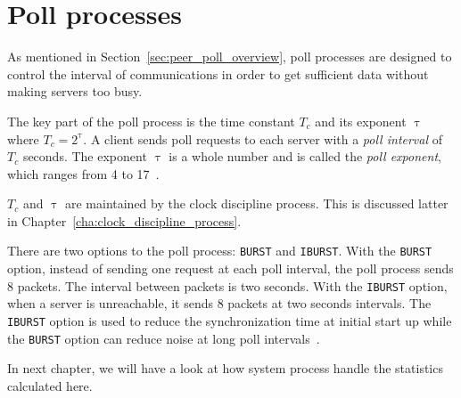 \section{Poll processes}%
\label{sec:poll_processes}
As mentioned in Section~\ref{sec:peer_poll_overview}, poll processes are
designed to control the interval of communications in order to get sufficient
data without making servers too busy. 

The key part of the poll process is the time constant $T_c$ and its
exponent $\uptau$ where $T_c = 2 ^ {\uptau}$. A client sends poll requests to
each server with a \emph{poll interval} of $T_c$ seconds. The exponent $\uptau$
is a whole number and is called the \emph{poll exponent}, which ranges from 4
to 17~\cite{rfc5905}.

$T_c$ and $\uptau$ are maintained by the clock discipline process. This is
discussed latter in Chapter~\ref{cha:clock_discipline_process}.

There are two options to the poll process: \verb|BURST| and \verb|IBURST|. With
the \verb|BURST| option, instead of sending one request at each poll interval,
the poll process sends 8 packets. The interval between packets is two seconds.
With the \verb|IBURST| option, when a server is unreachable, it sends 8 packets
at two seconds intervals. The \verb|IBURST| option is used to reduce the
synchronization time at initial start up while the \verb|BURST| option can
reduce noise at long poll intervals~\cite{poll_process}.

In next chapter, we will have a look at how system process handle the
statistics calculated here.
